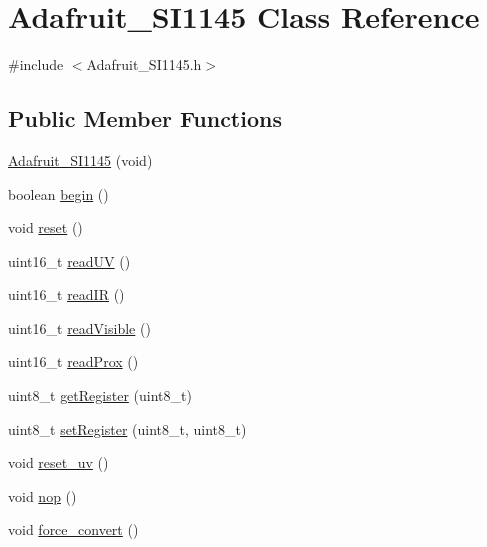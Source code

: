 \hypertarget{class_adafruit___s_i1145}{}\section{Adafruit\+\_\+\+S\+I1145 Class Reference}
\label{class_adafruit___s_i1145}


{\ttfamily \#include $<$Adafruit\+\_\+\+S\+I1145.\+h$>$}

\subsection*{Public Member Functions}
\begin{DoxyCompactItemize}
\item 
\hyperlink{class_adafruit___s_i1145_ae89a2548ed17479c42aa011df63160f2}{Adafruit\+\_\+\+S\+I1145} (void)
\item 
boolean \hyperlink{class_adafruit___s_i1145_ad17eb7214e6fba886b5595cf14e45cf0}{begin} ()
\item 
void \hyperlink{class_adafruit___s_i1145_ab7a22b92c14315e36b84a42498e970ea}{reset} ()
\item 
uint16\+\_\+t \hyperlink{class_adafruit___s_i1145_a9d1715d966500b5f5f88568a5b4f780b}{read\+UV} ()
\item 
uint16\+\_\+t \hyperlink{class_adafruit___s_i1145_a7295e72f69a558cd6b3ac382ac791688}{read\+IR} ()
\item 
uint16\+\_\+t \hyperlink{class_adafruit___s_i1145_a25bf65464093ec0ba5f9fdd884606a21}{read\+Visible} ()
\item 
uint16\+\_\+t \hyperlink{class_adafruit___s_i1145_a9b058485d8305725020219839285ea16}{read\+Prox} ()
\item 
uint8\+\_\+t \hyperlink{class_adafruit___s_i1145_ab0a29c37acf40dd227d7d23c5a5b0254}{get\+Register} (uint8\+\_\+t)
\item 
uint8\+\_\+t \hyperlink{class_adafruit___s_i1145_a591ba648b988a5dcb464b9f60a4a2c83}{set\+Register} (uint8\+\_\+t, uint8\+\_\+t)
\item 
void \hyperlink{class_adafruit___s_i1145_a67635a26a9c4c6b2fc2a7ffc86c2b5c9}{reset\+\_\+uv} ()
\item 
void \hyperlink{class_adafruit___s_i1145_a9290b9f5e92874e9e927cb27fd53a2ed}{nop} ()
\item 
void \hyperlink{class_adafruit___s_i1145_ad48796484b0107059cc8a8a33b673390}{force\+\_\+convert} ()
\end{DoxyCompactItemize}


